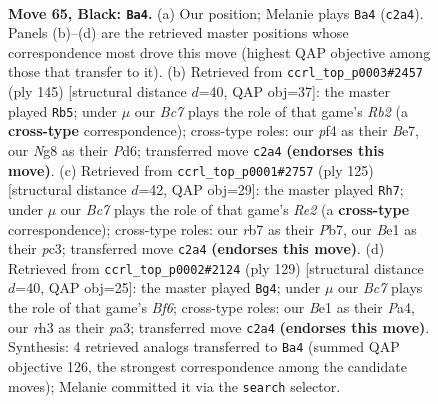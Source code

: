 \documentclass[11pt]{article}
\begin{document}
\clearpage

\begin{figure}[p]\centering
\begin{subfigure}{0.46\textwidth}\centering
\resizebox{\linewidth}{!}{%
\newchessgame
\chessboard[
  setfen={6nk/pR6/P6p/1P3p2/5P2/7R/2br4/4b1K1 b - - 0 65},
  showmover=false,
  pgfstyle=straightmove, color=movearrow, markmove={c2-a4}
]}
\caption{}
\end{subfigure}\hfill
\begin{subfigure}{0.46\textwidth}\centering
\resizebox{\linewidth}{!}{%
\newchessgame
\chessboard[
  setfen={8/1r2b1k1/3pP3/3P4/1pR2K2/1Pp5/2B5/8 b - - 17 73},
  showmover=false,
  pgfstyle=straightmove, color=movearrow, markmove={b7-b5}
]}
\caption{}
\end{subfigure}
\\[4pt]
\begin{subfigure}{0.46\textwidth}\centering
\resizebox{\linewidth}{!}{%
\newchessgame
\chessboard[
  setfen={5R2/1p2r3/p6p/P4p2/1P3k2/2P2n2/2K5/7R b - - 1 63},
  showmover=false,
  pgfstyle=straightmove, color=movearrow, markmove={e7-h7}
]}
\caption{}
\end{subfigure}\hfill
\begin{subfigure}{0.46\textwidth}\centering
\resizebox{\linewidth}{!}{%
\newchessgame
\chessboard[
  setfen={8/2kn4/4Rp2/5P1p/p1K2P1P/P4b2/8/8 b - - 2 65},
  showmover=false,
  pgfstyle=straightmove, color=movearrow, markmove={f3-g4}
]}
\caption{}
\end{subfigure}
\caption{\textbf{Move 65, Black: \texttt{Ba4}.} (a) Our position; Melanie plays \texttt{Ba4} (\texttt{c2a4}). Panels (b)--(d) are the retrieved master positions whose correspondence most drove this move (highest QAP objective among those that transfer to it). (b) Retrieved from \texttt{ccrl\_top\_p0003\#2457} (ply 145) [structural distance $d$=40, QAP obj=37]: the master played \texttt{Rb5}; under $\mu$ our \emph{Bc7} plays the role of that game's \emph{Rb2} (a \textbf{cross-type} correspondence); cross-type roles: our \emph{p}f4 as their \emph{B}e7, our \emph{N}g8 as their \emph{P}d6; transferred move \texttt{c2a4} \textbf{(endorses this move)}. (c) Retrieved from \texttt{ccrl\_top\_p0001\#2757} (ply 125) [structural distance $d$=42, QAP obj=29]: the master played \texttt{Rh7}; under $\mu$ our \emph{Bc7} plays the role of that game's \emph{Re2} (a \textbf{cross-type} correspondence); cross-type roles: our \emph{r}b7 as their \emph{P}b7, our \emph{B}e1 as their \emph{p}c3; transferred move \texttt{c2a4} \textbf{(endorses this move)}. (d) Retrieved from \texttt{ccrl\_top\_p0002\#2124} (ply 129) [structural distance $d$=40, QAP obj=25]: the master played \texttt{Bg4}; under $\mu$ our \emph{Bc7} plays the role of that game's \emph{Bf6}; cross-type roles: our \emph{B}e1 as their \emph{P}a4, our \emph{r}h3 as their \emph{p}a3; transferred move \texttt{c2a4} \textbf{(endorses this move)}. Synthesis: 4 retrieved analogs transferred to \texttt{Ba4} (summed QAP objective 126, the strongest correspondence among the candidate moves); Melanie committed it via the \texttt{search} selector.}
\label{fig:thought-m129}
\end{figure}
\end{document}
